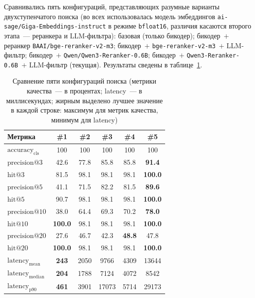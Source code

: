 Сравнивались пять конфигураций, представляющих разумные варианты двухступенчатого поиска (во всех использовалась модель эмбеддингов \texttt{ai-sage/Giga-Embeddings-instruct} в режиме \texttt{bfloat16}, различия касаются второго этапа~--- реранкера и LLM-фильтра): базовая (только бикодер); бикодер~$+$ реранкер \texttt{BAAI/bge-reranker-v2-m3}; бикодер~$+$ \texttt{bge-reranker-v2-m3}~$+$ LLM-фильтр; бикодер~$+$ \texttt{Qwen/Qwen3-Reranker-0.6B}; бикодер~$+$ \texttt{Qwen3-Reranker-0.6B}~$+$ LLM-фильтр (текущая). Результаты сведены в таблице~\ref{tab:eval-comparison}.
\begin{table}[H]
\caption{Сравнение пяти конфигураций поиска (метрики качества~--- в процентах; latency~--- в миллисекундах; жирным выделено лучшее значение в каждой строке: максимум для метрик качества, минимум для latency)}
\label{tab:eval-comparison}
\renewcommand{\arraystretch}{1.20}
\setlength{\tabcolsep}{4pt}
\footnotesize
\begin{tabularx}{\textwidth}{|>{\raggedright\arraybackslash}X|c|c|c|c|c|} \hline
\textbf{Метрика} & \textbf{\#1} & \textbf{\#2} & \textbf{\#3} & \textbf{\#4} & \textbf{\#5} \\ \hline
$\mathrm{accuracy}_{\mathrm{cls}}$ & 100 & 100 & 100 & 100 & 100 \\ \hline
$\mathrm{precision}@3$ & 42.6 & 77.8 & 85.8 & 85.8 & \textbf{91.4} \\ \hline
$\mathrm{hit}@3$ & 81.5 & 98.1 & 98.1 & 98.1 & \textbf{100.0} \\ \hline
$\mathrm{precision}@5$ & 41.1 & 71.5 & 82.2 & 81.5 & \textbf{89.6} \\ \hline
$\mathrm{hit}@5$ & 90.7 & 98.1 & 98.1 & 98.1 & \textbf{100.0} \\ \hline
$\mathrm{precision}@10$ & 38.0 & 64.4 & 69.3 & 70.2 & \textbf{78.0} \\ \hline
$\mathrm{hit}@10$ & \textbf{100.0} & 98.1 & 98.1 & 98.1 & \textbf{100.0} \\ \hline
$\mathrm{precision}@20$ & 27.6 & 46.7 & 42.3 & \textbf{48.8} & 47.8 \\ \hline
$\mathrm{hit}@20$ & \textbf{100.0} & 98.1 & 98.1 & 98.1 & \textbf{100.0} \\ \hline
$\mathrm{latency}_{\mathrm{mean}}$ & \textbf{243} & 2050 & 9766 & 4309 & 13644 \\ \hline
$\mathrm{latency}_{\mathrm{median}}$ & \textbf{204} & 1788 & 7124 & 4072 & 8542 \\ \hline
$\mathrm{latency}_{\mathrm{p90}}$ & \textbf{461} & 3901 & 17073 & 5714 & 29173 \\ \hline
\end{tabularx}
\end{table}

